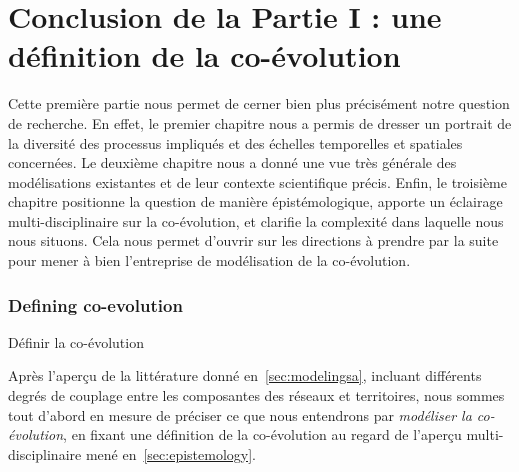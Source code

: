 






\chapter*{Conclusion de la Partie I : une définition de la co-évolution}









Cette première partie nous permet de cerner bien plus précisément notre question de recherche. En effet, le premier chapitre nous a permis de dresser un portrait de la diversité des processus impliqués et des échelles temporelles et spatiales concernées. Le deuxième chapitre nous a donné une vue très générale des modélisations existantes et de leur contexte scientifique précis. Enfin, le troisième chapitre positionne la question de manière épistémologique, apporte un éclairage multi-disciplinaire sur la co-évolution, et clarifie la complexité dans laquelle nous nous situons. Cela nous permet d'ouvrir sur les directions à prendre par la suite pour mener à bien l'entreprise de modélisation de la co-évolution.


\subsection*{Defining co-evolution}{Définir la co-évolution}

Après l'aperçu de la littérature donné en~\ref{sec:modelingsa}, incluant différents degrés de couplage entre les composantes des réseaux et territoires, nous sommes tout d'abord en mesure de préciser ce que nous entendrons par \emph{modéliser la co-évolution}, en fixant une définition de la co-évolution au regard de l'aperçu multi-disciplinaire mené en~\ref{sec:epistemology}.

